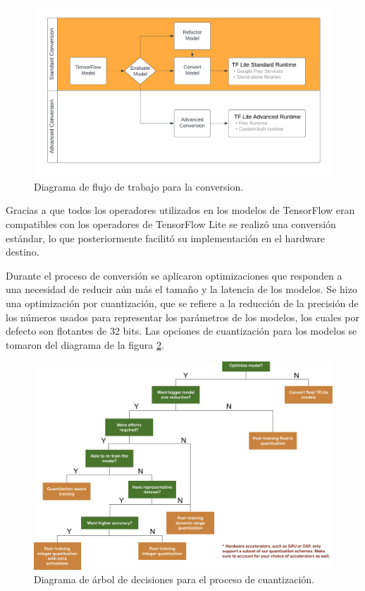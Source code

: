 \begin{figure}[h]
	\centering
	\includegraphics[scale=0.6]{./Figures/tf_convert_workflow_diag.png}
	\caption{Diagrama de flujo de trabajo para la conversion\protect\footnotemark.}
	\label{fig:tf2tflite_workflow}
\end{figure}

Gracias a que todos los operadores utilizados en los modelos de TensorFlow eran compatibles con los operadores de TensorFlow Lite se realizó una conversión estándar, lo que posteriormente facilitó su implementación en el hardware destino.

Durante el proceso de conversión se aplicaron optimizaciones que responden a una necesidad de reducir aún más el tamaño y la latencia de los modelos. Se hizo una optimización por cuantización, que se refiere a la reducción de la precisión de los números usados para representar los parámetros de los modelos, los cuales por defecto son flotantes de 32 bits. Las opciones de cuantización para los modelos se tomaron del diagrama de la figura \ref{fig:tf_quantization_tree}.

\begin{figure}[h]
	\centering
	\includegraphics[scale=0.3]{./Figures/tf_quantization_decision_tree.png}
	\caption{Diagrama de árbol de decisiones para el proceso de cuantización\protect\footnotemark.}
	\label{fig:tf_quantization_tree}
\end{figure}

